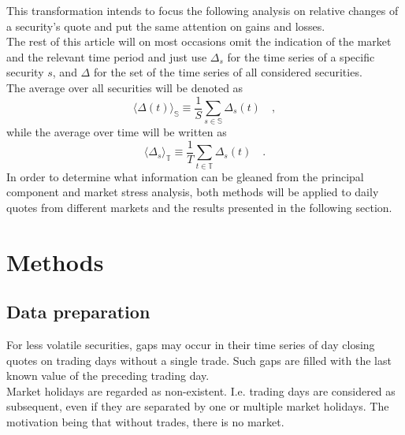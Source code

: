 \documentclass[11pt,twoside,a4paper]{article}
\numberwithin{equation}{section}
\begin{document}
This transformation intends to focus the following analysis on relative changes of a security's quote and put the same attention on gains and losses.\\
The rest of this article will on most occasions omit the indication of the market and the relevant time period and just use $\Delta_s$ for the time series of a specific security $s$, and $\Delta$ for the set of the time series of all considered securities.\\
The average over all securities will be denoted as
\begin{equation}
\langle\Delta(t)\rangle_\mathbb{S}\equiv\frac{1}{S}\sum_{s\in \mathbb{S}}\Delta_s(t)\quad,
\end{equation}
while the average over time will be written as
\begin{equation}
\langle\Delta_s\rangle_\mathbb{T}\equiv\frac{1}{T}\sum_{t\in \mathbb{T}}\Delta_s(t)\quad.
\end{equation}
In order to determine what information can be gleaned from the principal component and market stress analysis, both methods will be applied to daily quotes from different markets and the results presented in the following section.
\section{Methods}
\subsection{Data preparation}
For less volatile securities, gaps may occur in their time series of day closing quotes on trading days without a single trade. Such gaps are filled with the last known value of the preceding trading day.\\
Market holidays are regarded as non-existent. I.e. trading days are considered as subsequent, even if they are separated by one or multiple market holidays. The motivation being that without trades, there is no market.
\end{document}
